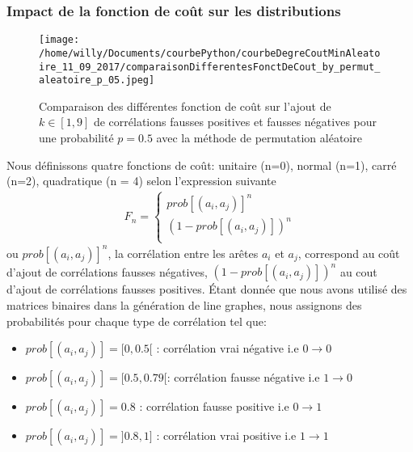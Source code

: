 \subsubsection{Impact de la fonction de co\^ut sur les distributions}
\label{fonctionDeCout}
\begin{centering} 
\begin{figure}[htb!] 
\texttt{[image: /home/willy/Documents/courbePython/courbeDegreCoutMinAleatoire\_11\_09\_2017/comparaisonDifferentesFonctDeCout\_by\_permut\_aleatoire\_p\_05.jpeg]}
\caption{ Comparaison des diff\'erentes fonction de co\^ut sur l'ajout de $k \in [1,9]$ de corr\'elations fausses positives et fausses n\'egatives pour une probabilit\'e $p = 0.5$ avec la m\'ethode de permutation al\'eatoire }
\label{compareDifferentesFonctionDeCout_p05} 
\end{figure}
\end{centering} 
Nous d\'efinissons quatre fonctions de co\^ut: unitaire (n=0), normal (n=1), carr\'e (n=2), quadratique (n = 4) selon l'expression suivante
\begin{equation}
	\begin{aligned}
	F_n = 
	\begin{cases}
		prob[(a_i,a_j)]^n   \\
		(1 - prob[(a_i,a_j)])^n \\
	\end{cases}
	\end{aligned}
\end{equation}
ou $prob[(a_i,a_j)]^n$, la corr\'elation entre les ar\^etes $a_i$ et $a_j$, correspond au co\^ut d'ajout de corr\'elations fausses n\'egatives, 
$(1-prob[(a_i,a_j)])^n$ au cout d'ajout de corr\'elations fausses positives.
\newline
\'Etant donn\'ee que nous avons utilis\'e des matrices binaires dans la g\'en\'eration de line graphes, nous assignons des probabilit\'es pour chaque type de corr\'elation tel que:
\begin{itemize}
\item $prob[(a_i,a_j)] = [0, 0.5[ $ : corr\'elation vrai n\'egative i.e $0 \rightarrow 0$
\item $prob[(a_i,a_j)] = [0.5, 0.79[ $: corr\'elation fausse n\'egative i.e $1 \rightarrow 0$
\item $prob[(a_i,a_j)] = 0.8 $ : corr\'elation fausse positive i.e $0 \rightarrow 1$
\item $prob[(a_i,a_j)] = ]0.8, 1] $ : corr\'elation vrai positive i.e $1 \rightarrow 1$
\end{itemize}

